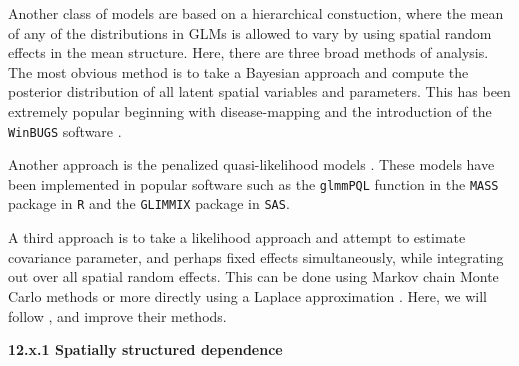\documentclass[12pt, titlepage]{article}
\begin{document}
Another class of models are based on a hierarchical constuction, where the mean of any of the distributions in GLMs is allowed to vary by using spatial random effects in the mean structure.  Here, there are three broad methods of analysis.  The most obvious method is to take a Bayesian approach and compute the posterior distribution of all latent spatial variables and parameters.  This has been extremely popular beginning with disease-mapping \citep{clayton_empirical_1987} and the introduction of the \texttt{WinBUGS} software \citep{lunn_winbugs-bayesian_2000}. 

Another approach is the penalized quasi-likelihood models \citep{breslow_approximate_1993, WolfingerEtAl1993GeneralizedLinearMixed233}.  These models have been implemented in popular software such as the \texttt{glmmPQL} function in the \texttt{MASS} package in \texttt{R} and the \texttt{GLIMMIX} package in \texttt{SAS}.

A third approach is to take a likelihood approach and attempt to estimate covariance parameter, and perhaps fixed effects simultaneously, while integrating out over all spatial random effects.   This can be done using Markov chain Monte Carlo methods \citep[e.g.,][]{christensen_monte_2004} or more directly using a Laplace approximation \citep[e.g.,][]{evangelou_estimation_2011, bonat_practical_2016}.  Here, we will follow \citet{bonat_practical_2016}, and improve their methods.





{\large \flushleft \textbf{12.x.1 Spatially structured dependence}}
\end{document}
